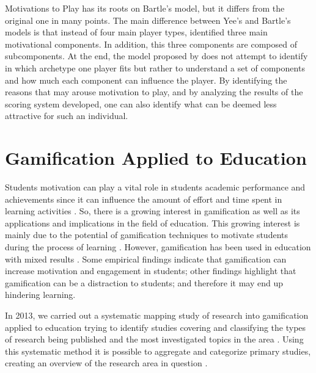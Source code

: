 Motivations to Play \cite{yee2006motivations} has its roots on Bartle's model, but it differs from the original one in many points. 
The main difference between Yee's and Bartle's models is that instead of four main player types, \citeauthor{yee2006motivations} identified three main motivational components.
In addition, this three components are composed of subcomponents.
At the end, the model proposed by \citeauthor{yee2006motivations} does not attempt to identify in which archetype one player fits but rather to understand a set of components and how much each component can influence the player. 
By identifying the reasons that may arouse motivation to play, and by analyzing the results of the scoring system developed, one can also identify what can be deemed less attractive for such an individual. 

\section{Gamification Applied to Education}

Students motivation can play a vital role in students academic performance and achievements since it can influence the amount of effort and time spent in learning activities \cite{linehan2011}. So, there is a growing interest in gamification as well as its applications and implications in the field of education. This growing interest is mainly due to the potential of gamification techniques to motivate students during the process of learning \cite{Borges2014SAC}.
However, gamification has been used in education with mixed results \cite{Berkling2013,Does_Gamification_Work,Mekler2015,Lieberoth2015,Dichev2017}. 
Some empirical findings indicate that gamification can increase motivation and engagement in students; other findings highlight that gamification can be a distraction to students; and therefore it may end up hindering learning. 

In 2013, we carried out a systematic mapping study of research into gamification applied to education trying to identify studies covering and classifying the types of research being published and the most investigated topics in the area \cite{Borges2014SAC}. Using this systematic method it is possible to aggregate and categorize primary studies, creating an overview of the research area in question \cite{petersen2008}. 

